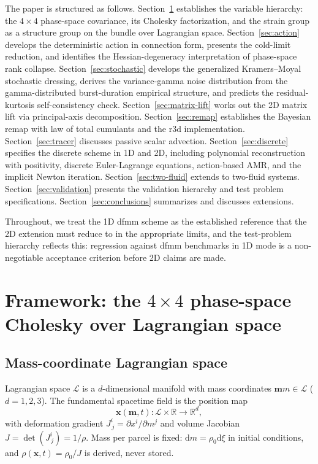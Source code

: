 \documentclass[11pt]{article}
\newcommand{\dd}{\mathrm{d}}
\newcommand{\bx}{\bm{x}}
\newcommand{\bmlab}{\bm{m}}
\begin{document}
The paper is structured as follows. Section~\ref{sec:framework}
establishes the variable hierarchy: the $4\times 4$ phase-space
covariance, its Cholesky factorization, and the strain group as a
structure group on the bundle over Lagrangian space.
Section~\ref{sec:action} develops the deterministic action in
connection form, presents the cold-limit reduction, and identifies
the Hessian-degeneracy interpretation of phase-space rank collapse.
Section~\ref{sec:stochastic} develops the generalized Kramers--Moyal
stochastic dressing, derives the variance-gamma noise distribution
from the gamma-distributed burst-duration empirical structure, and
predicts the residual-kurtosis self-consistency check.
Section~\ref{sec:matrix-lift} works out the 2D matrix lift via
principal-axis decomposition. Section~\ref{sec:remap} establishes
the Bayesian remap with law of total cumulants and the r3d
implementation. Section~\ref{sec:tracer} discusses passive scalar
advection. Section~\ref{sec:discrete} specifies the discrete scheme
in 1D and 2D, including polynomial reconstruction with positivity,
discrete Euler-Lagrange equations, action-based AMR, and the implicit
Newton iteration. Section~\ref{sec:two-fluid} extends to two-fluid
systems. Section~\ref{sec:validation} presents the validation
hierarchy and test problem specifications.
Section~\ref{sec:conclusions} summarizes and discusses extensions.

Throughout, we treat the 1D dfmm scheme as the established reference
that the 2D extension must reduce to in the appropriate limits, and
the test-problem hierarchy reflects this: regression against dfmm
benchmarks in 1D mode is a non-negotiable acceptance criterion before
2D claims are made.

\section{Framework: the $4\times 4$ phase-space Cholesky over Lagrangian
  space}
\label{sec:framework}

\subsection{Mass-coordinate Lagrangian space}

Lagrangian space $\mathcal{L}$ is a $d$-dimensional manifold with mass
coordinates $\bmlab{m}\in\mathcal{L}$ ($d=1,2,3$). The fundamental
spacetime field is the position map
\begin{equation}
  \bx(\bmlab,t):\mathcal{L}\times\mathbb{R}\to\mathbb{R}^d,
\end{equation}
with deformation gradient $J^i_{\,j} = \partial x^i/\partial m^j$ and
volume Jacobian $J = \det(J^i_{\,j}) = 1/\rho$. Mass per parcel is
fixed: $\dd m = \rho_0 \dd\xi$ in initial conditions, and
$\rho(\bx,t) = \rho_0/J$ is derived, never stored.
\end{document}
